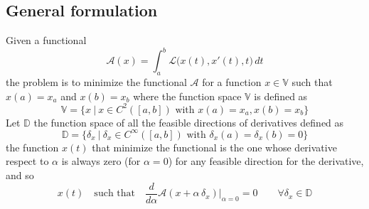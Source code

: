 \subsection{General formulation} \label{sec:func:eullag}
	Given a functional
	\begin{equation}
		\mathcal A(x) = \int_a^b \mathcal L\big(x(t),x'(t),t\big)\, dt
	\end{equation}
	the problem is to minimize the functional $\mathcal A$ for a function $x \in \mathds V$ such that $x(a) = x_a$ and $x(b) = x_b$ where the function space $\mathds V$ is defined as
	\[ \mathds V = \big\{ x \ | \ x\in C^2([a,b]) \textrm{ with } x(a) = x_a,x(b) = x_b \big\} \]
	Let $\mathds D$ the function space of all the feasible directions of derivatives defined as
	\[ \mathds D = \big\{ \delta_x \ | \ \delta_x \in C^{\infty}([a,b]) \textrm{ with } \delta_x(a) = \delta_x(b) = 0 \big\} \]
	the function $x(t)$ that minimize the functional is the one whose derivative respect to $\alpha$ is always zero (for $\alpha = 0$) for any feasible direction for the derivative, and so 
	\[ x(t) \quad\textrm{such that} \quad \frac{d}{d\alpha} \mathcal{A}(x+\alpha\, \delta_x) \Big|_{\alpha = 0} = 0 \qquad \forall \delta_x \in \mathds D \]	
	
